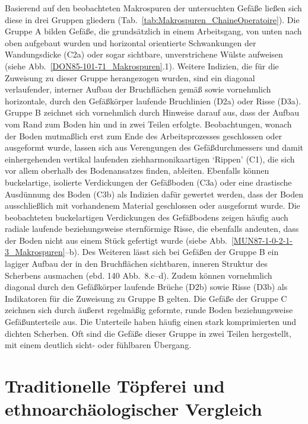 \vspace{1.5em}
\noindent Basierend auf den beobachteten Makrospuren der untersuchten Gefäße ließen sich diese in drei Gruppen gliedern (Tab.~\ref{tab:Makrospuren_ChaineOperatoire}). Die Gruppe A bilden Gefäße, die grundsätzlich in einem Arbeitsgang, von unten nach oben aufgebaut wurden und horizontal orientierte Schwankungen der Wandungsdicke (C2a) oder sogar sichtbare, unverstrichene Wülste aufweisen (siehe Abb.~\ref{DON85-101-71_Makrospuren}.1). Weitere Indizien, die für die Zuweisung zu dieser Gruppe herangezogen wurden, sind ein diagonal verlaufender, interner Aufbau der Bruchflächen gemäß \textcite[140 Abb.~8.b]{Lindahl.2010} sowie vornehmlich horizontale, durch den Gefäßkörper laufende Bruchlinien (D2a) oder Risse (D3a). Gruppe B zeichnet sich vornehmlich durch Hinweise darauf aus, dass der Aufbau vom Rand zum Boden hin und in zwei Teilen erfolgte. Beobachtungen, wonach der Boden mutmaßlich erst zum Ende des Arbeitsprozesses geschlossen oder ausgeformt wurde, lassen sich aus Verengungen des Gefäßdurchmessers und damit einhergehenden vertikal laufenden ziehharmonikaartigen \enquote*{Rippen} (C1), die sich vor allem oberhalb des Bodenansatzes finden, ableiten. Ebenfalls können buckelartige, isolierte Verdickungen der Gefäßboden (C3a) oder eine drastische Ausdünnung des Boden (C3b) als Indizien dafür gewertet werden, dass der Boden ausschließlich mit vorhandenem Material geschlossen oder ausgeformt wurde. Die beobachteten buckelartigen Verdickungen des Gefäßbodens zeigen häufig auch radiale laufende beziehungsweise sternförmige Risse, die ebenfalls andeuten, dass der Boden nicht aus einem Stück gefertigt wurde (siebe Abb.~\ref{MUN87-1-0-2-1-3_Makrospuren}--b). Des Weiteren lässt sich bei Gefäßen der Gruppe B ein lagiger Aufbau der in den Bruchflächen sichtbaren, inneren Struktur des Scherbens ausmachen (ebd. 140 Abb.~8.c--d). Zudem können vornehmlich diagonal durch den Gefäßkörper laufende Brüche (D2b) sowie Risse (D3b) als Indikatoren für die Zuweisung zu Gruppe B gelten. Die Gefäße der Gruppe C zeichnen sich durch äußerst regelmäßig geformte, runde Boden beziehungsweise Gefäßunterteile aus. Die Unterteile haben häufig einen stark komprimierten und dichten Scherben. Oft sind die Gefäße dieser Gruppe in zwei Teilen hergestellt, mit einem deutlich sicht- oder fühlbaren Übergang. 


\section{Traditionelle Töpferei und ethnoarchäologischer Vergleich}\label{sec:ToepfereiEthnogr}

